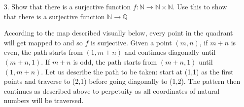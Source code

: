 \documentclass[12pt,letterpaper,reqno]{amsart}
\newcommand{\N}{\mathbb N}
\newcommand{\Q}{\mathbb Q}
\newcommand{\id}{\mathrm{id}}
\begin{document}
\begin{enumerate}
\begin{flushleft}
\iffalse
We next wish to show that $f$ is surjective by showing $\forall x \in A$, $\exists\,x^\prime \in A$ s.t. $f(x^\prime) = x$. We are given that $\forall x \in A$, $\exists\, n(x) \in \N$ s.t. $f^{n(x)}(x) = x$, which implies that $f(f^{n(x)-1}(x)) = x$. Since $f: A \rightarrow A$, we know that $f^{n(x)-1} \in A$ and if $n(x) > 0$, $n(x)-1 \in \N$. If $n(x) = 0$, then $f^{n(x)}(x) = f^0(x) = x = \id_A$, where $\id_A: A \rightarrow A$ is the identity function. Therefore, $x^\prime = f^{n(x)-1}$ if $n(x) > 0$ and $x^\prime = x$ if $n(x) = 0$. Therefore, $\forall x \in A$, $\exists\, n(x) \in \N$ s.t. $f^{n(x)}(x) = f(f^{n(x)-1}(x)) = x$. This implies that $\exists f^{n(x)-1}(x) \in A$ s.t. $f(f^{n(x)-1}(x)) = x$, and so $f$ is surjective. Since $f$ is both injective and surjective, $f$ is bijective as was to be shown. $\Box$ 
\newline
\fi
\end{flushleft}
\newpage
\item[3.] Show that there is a surjective function $f : \N \rightarrow \N \times \N$. Use this to show that there is a surjective
function $\N \rightarrow \Q$\newline
\begin{flushleft}
According to the map described visually below, every point in the quadrant will get mapped to and so $f$ is surjective. Given a point $(m,n)$, if $m+n$ is even, the path starts from $(1, m+n)$ and continues diagonally until $(m+n,1)$. If $m+n$ is odd, the path starts from $(m+n, 1)$ until $(1, m+n)$. Let us describe the path to be taken: start at (1,1) as the first points and traverse to (2,1) before going diagonally to (1,2). The pattern then continues as described above to perpetuity as all coordinates of natural numbers will be traversed. 
\end{flushleft}


\end{enumerate}
\end{document}
